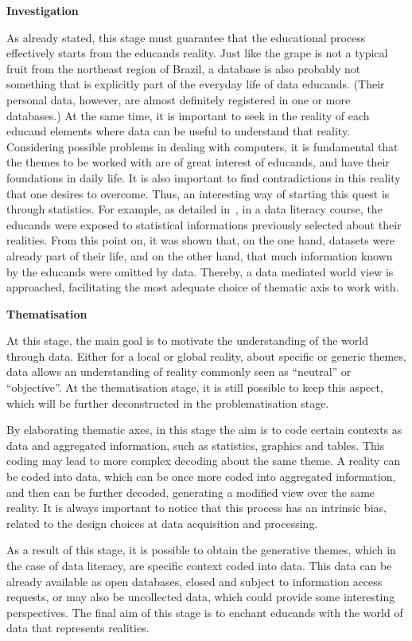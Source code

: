 \noindent \textbf{Investigation}

As already stated, this stage must guarantee that the educational process effectively starts from the educands reality. Just like the grape is not a typical fruit from the northeast region of Brazil, a database is also probably not something that is explicitly part of the everyday life of data educands. (Their personal data, however, are almost definitely registered in one or more databases.) At the same time, it is important to seek in the reality of each educand elements where data can be useful to understand that reality. Considering possible problems in dealing with computers, it is fundamental that the themes to be worked with are of great interest of educands, and have their foundations in daily life. It is also important to find contradictions in this reality that one desires to overcome. Thus, an interesting way of starting this quest is through statistics. For example, as detailed in~, in a data literacy course, the educands were exposed to statistical informations previously selected about their realities. From this point on, it was shown that, on the one hand, datasets were already part of their life, and on the other hand, that much information known by the educands were omitted by data. Thereby, a data mediated world view is approached, facilitating the most adequate choice of thematic axis to work with.

\noindent \textbf{Thematisation}

At this stage, the main goal is to motivate the understanding of the world through data. Either for a local or global reality, about specific or generic themes, data allows an understanding of reality commonly seen as “neutral” or “objective”. At the thematisation stage, it is still possible to keep this aspect, which will be further deconstructed in the problematisation stage.

By elaborating thematic axes, in this stage the aim is to code certain contexts as data and aggregated information, such as statistics, graphics and tables. This coding may lead to more complex decoding about the same theme. A reality can be coded into data, which can be once more coded into aggregated information, and then can be further decoded, generating a modified view over the same reality. It is always important to notice that this process has an intrinsic bias, related to the design choices at data acquisition and processing. 

As a result of this stage, it is possible to obtain the generative themes, which in the case of data literacy, are specific context coded into data. This data can be already available as open databases, closed and subject to information access requests, or may also be uncollected data, which could provide some interesting perspectives. The final aim of this stage is to enchant educands with the world of data that represents realities.

